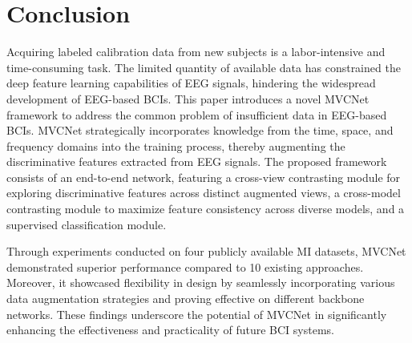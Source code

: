 \documentclass[journal]{IEEEtran}
\begin{document}
\section{Conclusion}\label{sect:conclusions}
Acquiring labeled calibration data from new subjects is a labor-intensive and time-consuming task. The limited quantity of available data has constrained the deep feature learning capabilities of EEG signals, hindering the widespread development of EEG-based BCIs. This paper introduces a novel MVCNet framework to address the common problem of insufficient data in EEG-based BCIs. MVCNet strategically incorporates knowledge from the time, space, and frequency domains into the training process, thereby augmenting the discriminative features extracted from EEG signals. The proposed framework consists of an end-to-end network, featuring a cross-view contrasting module for exploring discriminative features across distinct augmented views, a cross-model contrasting module to maximize feature consistency across diverse models, and a supervised classification module.

Through experiments conducted on four publicly available MI datasets, MVCNet demonstrated superior performance compared to 10 existing approaches. Moreover, it showcased flexibility in design by seamlessly incorporating various data augmentation strategies and proving effective on different backbone networks. These findings underscore the potential of MVCNet in significantly enhancing the effectiveness and practicality of future BCI systems. 

 
\end{document}
